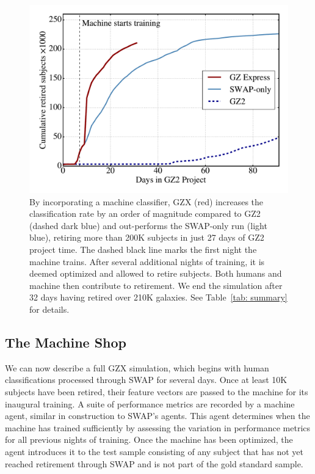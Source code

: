\documentclass[twocolumn, trackchanges, linenumbers]{aastex6}%
\begin{document}
\begin{figure}[t!]
\centering
\includegraphics[width=5.5in]{f7.pdf}
\caption{By incorporating a machine classifier, GZX (red) increases the classification rate by an order of magnitude compared to GZ2 (dashed dark blue) and out-performs the SWAP-only run (light blue), retiring more than 200K subjects in just 27 days of GZ2 project time. The dashed black line marks the first night the machine trains. After several additional nights of training, it is deemed optimized and allowed to retire subjects. Both humans and machine then contribute to retirement. We end the simulation after 32 days having retired over 210K galaxies. See Table~\ref{tab: summary} for details. \label{fig: money}}
\end{figure}


\subsection{The Machine Shop}\label{sec: machine shop}
We can now describe a full GZX simulation, which begins with human classifications 
processed through SWAP for several days.   
Once at least 10K subjects have been retired, their feature vectors are passed to 
the machine for its inaugural training. 
A suite of performance metrics are recorded by a machine agent, similar
in construction to SWAP's agents. This agent determines 
when the machine has trained sufficiently by assessing the variation
in performance metrics for all previous nights of training. 
Once the machine has been optimized, the agent introduces it to the test sample
consisting of any subject that has not yet reached retirement through SWAP 
and is not part of the gold standard sample.  
\end{document}
